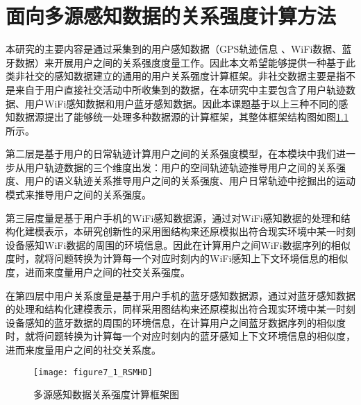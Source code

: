 \chapter{面向多源感知数据的关系强度计算方法}
\label{chap:chapter04}
本研究的主要内容是通过采集到的用户感知数据（GPS轨迹信息 、WiFi数据、蓝牙数据）来开展用户之间的关系强度度量工作。因此本文希望能够提供一种基于此类非社交的感知数据建立的通用的用户关系强度计算框架。非社交数据主要是指不是来自于用户直接社交活动中所收集到的数据，在本研究中主要包含了用户轨迹数据、用户WiFi感知数据和用户蓝牙感知数据。因此本课题基于以上三种不同的感知数据源提出了能够统一处理多种数据源的计算框架，其整体框架结构图如图\ref{fig:7_1}所示。
\par 第二层是基于用户的日常轨迹计算用户之间的关系强度模型，在本模块中我们进一步从用户轨迹数据的三个维度出发：用户的空间轨迹轨迹推导用户之间的关系强度、用户的语义轨迹关系推导用户之间的关系强度、用户日常轨迹中挖掘出的运动模式来推导用户之间的关系强度。
\par 第三层度量是基于用户手机的WiFi感知数据源，通过对WiFi感知数据的处理和结构化建模表示，本研究创新性的采用图结构来还原模拟出符合现实环境中某一时刻设备感知WiFi数据的周围的环境信息。因此在计算用户之间WiFi数据序列的相似度时，就将问题转换为计算每一个对应时刻内的WiFi感知上下文环境信息的相似度，进而来度量用户之间的社交关系强度。
\par 在第四层中用户关系度量是基于用户手机的蓝牙感知数据源，通过对蓝牙感知数据的处理和结构化建模表示，同样采用图结构来还原模拟出符合现实环境中某一时刻设备感知的蓝牙数据的周围的环境信息，在计算用户之间蓝牙数据序列的相似度时，就将问题转换为计算每一个对应时刻内的蓝牙感知上下文环境信息的相似度，进而来度量用户之间的社交关系度。
\begin{figure}[htp]
\centering
\texttt{[image: figure7\_1\_RSMHD]}
\caption{多源感知数据关系强度计算框架图}
\label{fig:7_1}
\end{figure}

